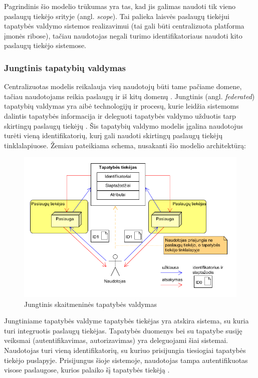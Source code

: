 Pagrindinis šio modelio trūkumas yra tas, kad jis galimas naudoti tik vieno paslaugų tiekėjo srityje (angl. \textit{scope}). Tai palieka laisvės paslaugų tiekėjui tapatybės valdymo sistemos
realizavimui (tai gali būti centralizuota platforma įmonės ribose), tačiau naudotojas negali turimo identifikatoriaus
naudoti kito paslaugų tiekėjo sistemose.

\subsubsection{Jungtinis tapatybių valdymas}



Centralizuotas modelis reikalauja visų naudotojų būti tame pačiame domene, tačiau naudotojams reikia
paslaugų ir iš kitų domenų \cite{Cao2010}. Jungtinis (angl. \textit{federated}) tapatybių valdymas yra aibė technologijų
ir procesų, kurie leidžia sistemoms dalintis tapatybės informacija ir deleguoti tapatybės valdymo užduotis
tarp skirtingų paslaugų tiekėjų \cite{Maler2008}. Šis tapatybių valdymo modelis įgalina naudotojus turėti vieną
identifikatorių, kurį gali naudoti skirtingų paslaugų tiekėjų tinklalapiuose. Žemiau pateikiama schema, nusakanti
šio modelio architektūrą:

\begin{figure}[H]
    \centering
    \includegraphics[scale=0.75]{img/federatedModel}
    \caption{Jungtinis skaitmeninės tapatybės valdymas \cite{Cao2010}}
    \label{fig:federatedModel}
\end{figure}

Jungtiniame tapatybės valdyme tapatybės tiekėjas yra atskira sistema, su kuria turi integruotis paslaugų tiekėjas. Tapatybės
duomenys bei su tapatybe susiję veiksmai (autentifikavimas, autorizavimas) yra deleguojami šiai sistemai. Naudotojas turi vieną identifikatorių,
su kuriuo prisijungia tiesiogiai tapatybės tiekėjo puslapyje. Prisijungus šioje sistemoje, naudotojas tampa
autentifikuotas visose paslaugose, kurios palaiko šį tapatybės tiekėją \cite{Maler2008}.

